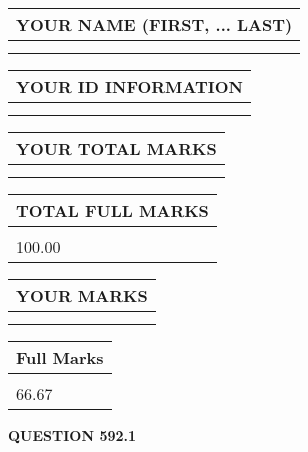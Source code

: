 \documentclass{ctexart}
\begin{document}
   
   
   
\newpage 
\setcounter{page}{ 
   592001 } 
   
   
   
   
\noindent\begin{tabular}{|l|}
\hline
YOUR NAME (FIRST, ... LAST)  \\
\hline
 \\ 
 \\ 
\hline
\end{tabular}
\hspace{0.05in} \begin{tabular}{|l|}
\hline
 YOUR   ID   INFORMATION  \\
\hline
 \\ 
 \\ 
\hline
\end{tabular}
   
   
\vspace{0.2in}\noindent\begin{tabular}{|l|}
\hline
YOUR TOTAL MARKS  \\
\hline
 \\ 
 \\ 
\hline
\end{tabular}
\hspace{0.05in} \begin{tabular}{|l|}
\hline
TOTAL FULL MARKS  \\
\hline
 \\ 
100.00 \\
\hline
\end{tabular}
   
   
 \vspace{0.2in}
 
 
 
 
   
   
  
\vspace{0.2in}
  
\noindent\begin{tabular}{|l|}
\hline
 YOUR MARKS  \\
\hline
 \\ 
 \\ 
\hline
\end{tabular}
\hspace{0.05in} \begin{tabular}{|l|}
\hline
 Full Marks  \\
\hline
 \\ 
66.67 \\
\hline
\end{tabular}
{\textbf{\Large{QUESTION
592.1 
}}}
  
\end{document}
